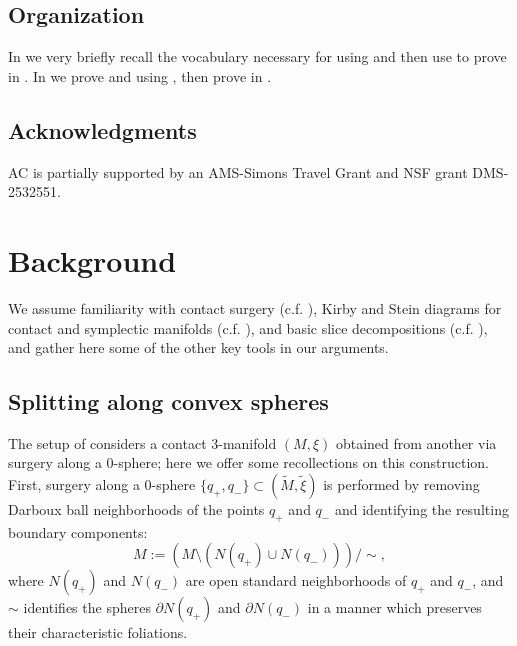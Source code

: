 \documentclass[11pt]{amsart}
\numberwithin{equation}{section}
\theoremstyle{plain}
\theoremstyle{definition}
\theoremstyle{remark}\newtheorem{rem}[equation]{Remark}%
\theoremstyle{remark}\newtheorem{obs}[equation]{Observation}%
\begin{document}
\subsection{Organization}
In  we very briefly recall the vocabulary necessary for using  and then use  to prove  in .  In  we prove  and  using , then prove  in .

\subsection*{Acknowledgments} AC is partially supported by an AMS-Simons Travel Grant and NSF grant DMS-2532551.






 
\section{Background}\label{sec:background}
We assume familiarity with contact surgery (c.f. \cite{GCT,ozbagci2013surgery}), Kirby and Stein diagrams for contact and symplectic manifolds (c.f. \cite{ozbagci2013surgery,gompf20234}), and basic slice decompositions (c.f. \cite{honda2000classification,honda2000classification2}), and gather here some of the other key tools in our arguments.

\subsection{Splitting along convex spheres}\label{subsec:background:spheres}
The setup of  considers a contact 3-manifold $(M,\xi)$ obtained from another via surgery along a 0-sphere; here we offer some recollections on this construction.  First, surgery along a 0-sphere $\{q_+,q_-\}\subset(\tilde{M},\tilde{\xi})$ is performed by removing Darboux ball neighborhoods of the points $q_+$ and $q_-$ and identifying the resulting boundary components:
$$M := (M\setminus(N(q_+)\cup N(q_-)))/\sim,$$
where $N(q_+)$ and $N(q_-)$ are open standard neighborhoods of $q_+$ and $q_-$, and $\sim$ identifies the spheres $\partial N(q_+)$ and $\partial N(q_-)$ in a manner which preserves their characteristic foliations.
\end{document}
